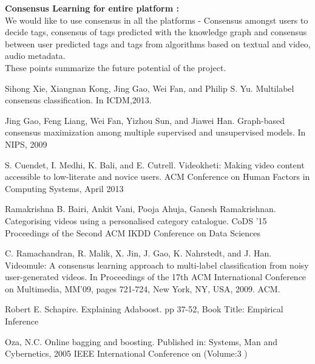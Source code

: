 \documentclass[12pt]{report}
\begin{document}
\textbf{Consensus Learning for entire platform :} \\
We would like to use consensus in all the platforms - Consensus amongst users to decide tags, consensus of tags predicted with the knowledge graph and consensus between user predicted tags and tags from algorithms based on textual and video, audio metadata.\\


These points summarize the future potential of the project.


\begin{thebibliography}{1}
Sihong Xie, Xiangnan Kong, Jing Gao, Wei Fan, and Philip S. Yu. Multilabel consensus classification. In ICDM,2013.

Jing  Gao,  Feng  Liang,  Wei Fan,  Yizhou  Sun,  and  Jiawei  Han. Graph-based consensus maximization among multiple supervised and unsupervised models.  In NIPS, 2009

 S. Cuendet, I. Medhi, K. Bali, and E. Cutrell.
Videokheti:  Making video content accessible to
low-literate and novice users. ACM Conference on
Human Factors in Computing Systems, April 2013

Ramakrishna B. Bairi, Ankit Vani, Pooja Ahuja, Ganesh Ramakrishnan. Categorising videos using a personalised category catalogue. CoDS '15 Proceedings of the Second ACM IKDD Conference on Data Sciences

C. Ramachandran, R. Malik, X. Jin, J. Gao,
K. Nahrstedt, and J. Han. Videomule:  A consensus learning approach to multi-label classification from noisy user-generated videos. In Proceedings of the 17th
ACM International Conference on Multimedia, MM'09, pages 721-724, New York, NY, USA, 2009. ACM.

Robert E. Schapire. Explaining Adaboost. pp 37-52, Book Title: Empirical Inference 

Oza, N.C. Online bagging and boosting. Published in: Systems, Man and Cybernetics, 2005 IEEE International Conference on  (Volume:3 ) 

\end{thebibliography}
\end{document}
